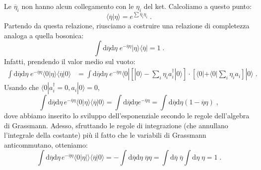 \documentclass[12pt,a4paper]{article}
\theoremstyle{definition}
\numberwithin{equation}{section}
\newcommand{\diff}[1][]{\mathrm{d}#1}
\newcommand{\bra}{\langle}
\newcommand{\ket}{\rangle}
\newcommand{\adj}[1]{#1^{\dagger}}
\begin{document}
Le $\overline{\eta}_i$ non hanno alcun collegamento con le $\eta_i$ del ket. Calcoliamo a questo punto:
$$
\bra \overline{\eta}|\eta\ket=e^{\sum\overline{\eta}_i\eta_i}\;.
$$
Partendo da questa relazione, riusciamo a costruire una relazione di completezza analoga a quella bosonica:
\begin{equation}
\int\diff{\overline{\eta}}\diff{\eta}\; e^{-\overline{\eta}\eta}|\eta\ket\bra\overline{\eta}|=1\;.
\end{equation}
Infatti, prendendo il valor medio sul vuoto:
\begin{align*}
\int\diff{\overline{\eta}}\diff{\eta}\;e^{-\overline{\eta}\eta}\bra 0|\eta\ket\bra\overline{\eta}|0\ket &= 
\int\diff{\overline{\eta}}\diff{\eta}\;e^{-\overline{\eta}\eta}\bra 0|\left[|0\ket -\sum_i\eta_i\adj{a}_i|0\ket\right]\cdot\left[\bra 0|+\bra 0|\sum_i\eta_ia_i\right]|0\ket\;.
\end{align*}
Usando che $\bra 0|\adj{a}_i=0, a_i|0\ket=0$,
$$
\int\diff{\overline{\eta}}\diff{\eta}\, e^{-\overline{\eta}\eta}\bra 0|\eta\ket\bra \overline{\eta}|0\ket=\int\diff{\overline{\eta}}\diff{\eta}e^{-\overline{\eta}\eta}=\int\diff{\overline{\eta}}\diff{\eta}(1-\overline{\eta}\eta)\;,
$$
dove abbiamo inserito lo sviluppo dell'esponenziale secondo le regole dell'algebra di Grassmann. Adesso, sfruttando le regole di integrazione (che annullano l'integrale della costante) più il fatto che le variabili di Grassmann anticommutano, otteniamo:
$$
\int\diff{\overline{\eta}}\diff{\eta}\, e^{-\overline{\eta}\eta}\bra 0|\eta|\ket\bra\overline{\eta}|0\ket=-\int\diff{\overline{\eta}}\diff{\eta}\;\overline{\eta}\eta=\int\diff{\overline{\eta}}\;\overline{\eta}\int\diff{\eta}\;\eta=1\;.
$$
\end{document}
